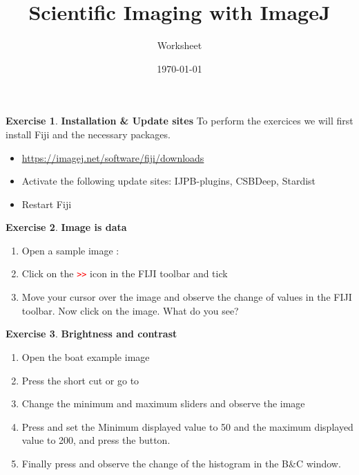 \documentclass[xcolor=table,DIV=19,twocolumn,10pt]{scrartcl}
\title{Scientific Imaging with ImageJ}
\subtitle{Worksheet}
\date{\today}
\theoremstyle{definition}
\newtheorem{exercice}{Exercise}
\begin{document}
\maketitle

\begin{exercice} \textbf{Installation \& Update sites}
  To perform the exercices we will first install Fiji and the necessary packages.
  \begin{itemize}
  \item \url{https://imagej.net/software/fiji/downloads}
  \item Activate the following update sites: IJPB-plugins, CSBDeep, Stardist
  \item Restart Fiji 
  \end{itemize}

\end{exercice}

\begin{exercice} \textbf{Image is data}
  \begin{enumerate}
  \item Open a sample image : 
  \item Click on the \textcolor{red}{\texttt{>>}} icon in the FIJI toolbar and tick
  \item Move your cursor over the image and observe the change of values in the FIJI toolbar. Now click on the image. What do you see?
  \end{enumerate}
\end{exercice}

\begin{exercice} \textbf{Brightness and contrast}
  \begin{enumerate}
  \item Open the boat example image 
  \item Press the short cut  or go to 
  \item Change the minimum and maximum sliders and observe the image
  \item Press  and set the Minimum displayed value to 50
    and the maximum displayed value to 200, and press the  button.
  \item Finally press  and observe the change of the
    histogram in the B\&C window.
  \end{enumerate}
\end{exercice}
\end{document}
